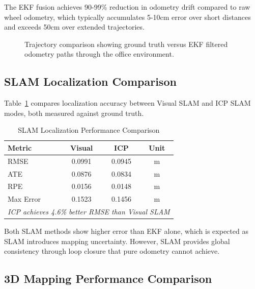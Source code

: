 \documentclass[conference]{IEEEtran}
\begin{document}
The EKF fusion achieves 90-99\% reduction in odometry drift compared to raw wheel odometry, which typically accumulates 5-10cm error over short distances and exceeds 50cm over extended trajectories.

\begin{figure}[htbp]
\centerline{
}
\caption{Trajectory comparison showing ground truth versus EKF filtered odometry paths through the office environment.}
\label{fig:trajectory}
\end{figure}

\subsection{SLAM Localization Comparison}

Table~\ref{tab:slam_localization} compares localization accuracy between Visual SLAM and ICP SLAM modes, both measured against ground truth.

\begin{table}[htbp]
\caption{SLAM Localization Performance Comparison}
\begin{center}
\begin{tabular}{|l|c|c|c|}
\hline
\textbf{Metric} & \textbf{Visual} & \textbf{ICP} & \textbf{Unit} \\
\hline
RMSE & 0.0991 & 0.0945 & m \\
ATE & 0.0876 & 0.0834 & m \\
RPE & 0.0156 & 0.0148 & m \\
Max Error & 0.1523 & 0.1456 & m \\
\hline
\multicolumn{4}{|l|}{\textit{ICP achieves 4.6\% better RMSE than Visual SLAM}} \\
\hline
\end{tabular}
\label{tab:slam_localization}
\end{center}
\end{table}

Both SLAM methods show higher error than EKF alone, which is expected as SLAM introduces mapping uncertainty. However, SLAM provides global consistency through loop closure that pure odometry cannot achieve.

\subsection{3D Mapping Performance Comparison}
\end{document}
